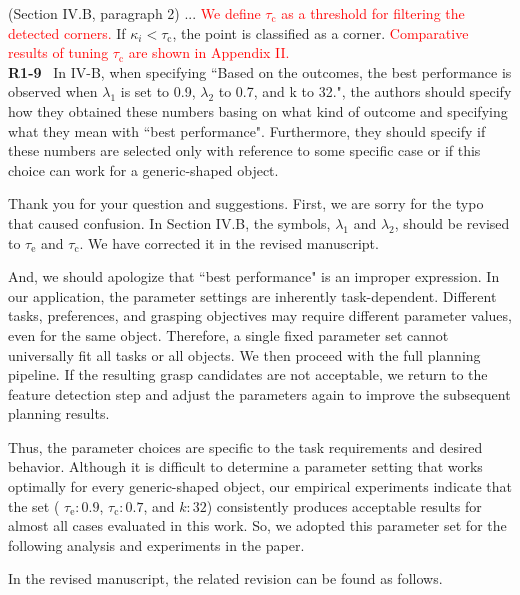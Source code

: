 \documentclass[journal]{IEEEtran}
\newcommand{\rev}[1]{\textcolor{red}{#1}}
\begin{document}
(Section IV.B, paragraph 2) ...
\rev{We define $\tau_\text{c}$ as a threshold for filtering the detected corners.} If $\kappa_i < \tau_\text{c}$, the point is classified as a corner. \rev{Comparative results of tuning $\tau_\text{c}$ are shown in Appendix II.}\\

\noindent
{\textbf{\color{black}R1-9}\color{gray}~
In IV-B, when specifying ``Based on the outcomes,
the best performance is observed when $\lambda_1$ is set to 0.9, $\lambda_2$ to
0.7, and k to 32.", the authors should specify how they obtained these numbers basing on what kind of outcome and specifying what they mean with ``best performance". Furthermore, they should specify if these numbers are selected only with reference to some specific case or if this choice can work for a generic-shaped object.
}

Thank you for your question and suggestions. First, we are sorry for the typo that caused confusion. In Section IV.B, the symbols, $\lambda_1$ and $\lambda_2$, should be revised to $\tau_\text{e}$ and $\tau_\text{c}$. We have corrected it in the revised manuscript.

And, we should apologize that “best performance" is an improper expression. 
In our application, the parameter settings are inherently task-dependent. Different tasks, preferences, and grasping objectives may require different parameter values, even for the same object. Therefore, a single fixed parameter set cannot universally fit all tasks or all objects.
We then proceed with the full planning pipeline. If the resulting grasp candidates are not acceptable, we return to the feature detection step and adjust the parameters again to improve the subsequent planning results. 

Thus, the parameter choices are specific to the task requirements and desired behavior.
Although it is difficult to determine a parameter setting that works optimally for every generic-shaped object, our empirical experiments indicate that the set ( $\tau_\text{e}:0.9$, $\tau_\text{c}:0.7$, and $k:32$) consistently produces acceptable results for almost all cases evaluated in this work. So, we adopted this parameter set for the following analysis and experiments in the paper.

In the revised manuscript, the related revision can be found as follows.
\end{document}
